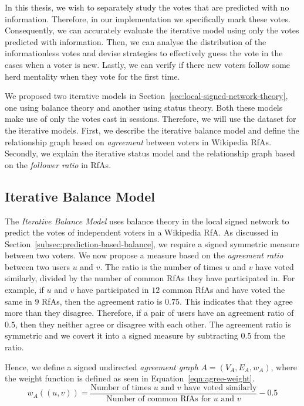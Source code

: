 In this thesis, we wish to separately study the votes that are predicted with no information.
Therefore, in our implementation we specifically mark these votes.
Consequently, we can accurately evaluate the iterative model using only the votes predicted with information.
Then, we can analyse the distribution of the informationless votes and devise strategies to effectively guess the vote in the cases when a voter is new.
Lastly, we can verify if there new voters follow some herd mentality when they vote for the first time.

We proposed two iterative models in Section~\ref{sec:local-signed-network-theory}, one using balance theory and another using status theory.
Both these models make use of only the votes cast in sessions.
Therefore, we will use the \wikirfa dataset for the iterative models.
First, we describe the iterative balance model and define the relationship graph based on \textit{agreement} between voters in Wikipedia RfAs.
Secondly, we explain the iterative status model and the relationship graph based on the \textit{follower ratio} in RfAs.

\subsection{Iterative Balance Model}
The \textit{Iterative Balance Model}  uses balance theory in the local signed network to predict the votes of independent voters in a Wikipedia RfA.
As discussed in Section~\ref{subsec:prediction-based-balance}, we require a signed symmetric measure between two voters.
We now propose a measure based on the \textit{agreement ratio} between two users $u$ and $v$.
The ratio is the number of times $u$ and $v$ have voted similarly, divided by the number of common RfAs they have participated in.
For example, if $u$ and $v$ have participated in $12$ common RfAs and have voted the same in $9$ RfAs, then the agreement ratio is $0.75$.
This indicates that they agree more than they disagree.
Therefore, if a pair of users have an agreement ratio of $0.5$, then they neither agree or disagree with each other.
The agreement ratio is symmetric and we covert it into a signed measure by subtracting 0.5 from the ratio.

Hence, we define a signed undirected \textit{agreement graph} $A= (V_{A},E_{A},w_{A})$, where the weight function is defined as seen in Equation~\eqref{eqn:agree-weight}.
\begin{equation}
    \label{eqn:agree-weight}
    w_{A}((u,v)) = \frac{\text{Number of times } u \text{ and } v \text{ have voted similarly}}{\text{Number of common RfAs for } u \text{ and } v} -0.5
\end{equation}

